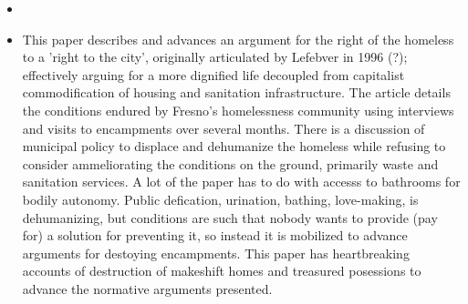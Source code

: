 \documentclass{article}
\begin{document}
\begin{itemize}
\item \cite {speer2016RightInfrastructure}
\item This paper describes and advances an argument for the right of the homeless to a 'right to the city', originally articulated by Lefebver in 1996 (?); effectively arguing for a more dignified life decoupled from capitalist commodification of housing and sanitation infrastructure. The article details the conditions endured by Fresno's homelessness community using interviews and visits to encampments over several months. There is a discussion of municipal policy to displace and dehumanize the homeless while refusing to consider ammeliorating the conditions on the ground, primarily waste and sanitation services. A lot of the paper has to do with accesss to bathrooms for bodily autonomy. Public defication, urination, bathing, love-making, is dehumanizing, but conditions are such that nobody wants to provide (pay for) a solution for preventing it, so instead it is mobilized to advance arguments for destoying encampments. This paper has heartbreaking accounts of destruction of makeshift homes and treasured posessions to advance the normative arguments presented.

  
\end{itemize}
\end{document}
